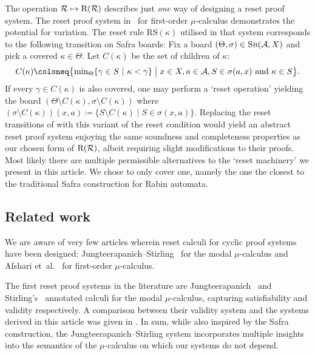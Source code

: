 The operation $\mathcal{R} \mapsto \mathrm{R}(\mathcal{R})$ describes just \emph{one} way of
designing a reset proof system.
The reset proof system in~\parencite{afshariCyclicProofsFirstorder2022a} for first-order \( \mu \)-calculus demonstrates the potential for variation.
The reset rule $\text{RS}(\kappa)$ utilised in that system corresponds
 to the following transition on Safra boards: Fix
a board $(\Theta, \sigma) \in \textsc{Sb}(\mathcal{A}, X)$ and pick a covered $\kappa \in
\Theta$. Let $C(\kappa)$ be the set of children of $\kappa$:
\[
  C(\kappa)
  \coloneq \bigl\{\text{min}_\Theta \{\gamma \in S ~|~ \kappa < \gamma\} \bigm| x \in X, a \in
  \Aa, S \in \sigma(a, x) \text{ and } \kappa \in S\bigr\}.
\]
If every $\gamma \in
C(\kappa)$ is also covered, one may perform a `reset operation' yielding the
board $(\Theta \setminus C(\kappa), \sigma \setminus C(\kappa))$ where $(\sigma
\setminus C(\kappa))(x, a) \coloneq \{S \setminus C(\kappa) \mid S \in \sigma(x,
a)\}$. Replacing the reset transitions of  with this variant of
the reset condition would yield an abstract reset proof system
enjoying the same soundness and completeness properties as our chosen form of $\mathrm{R}(\mathcal{R})$, albeit requiring
slight modifications to their proofs. Most likely there are multiple
permissible alternatives to the `reset machinery' we
present in this article. We chose to only
cover one, namely the one the closest to the traditional Safra construction for
Rabin automata.

\subsection*{Related work}
We are aware of very few articles wherein reset calculi for cyclic proof systems have been designed:
Jungteerapanich--Stirling~\parencite{jungteerapanichTableauSystemsModal2010,stirlingProofSystemNames2013} for the modal \( \mu \)-calculus
and Afshari et~al.~\parencite{afshariCyclicProofsFirstorder2022a} for first-order \( \mu \)-calculus.

The first reset proof systems in the literature are
Jungteerapanich~\parencite{jungteerapanichTableauSystemsModal2010} and
Stirling's~\parencite{stirlingProofSystemNames2013} annotated calculi for the
modal $\mu$-calculus, capturing satisfiability and validity respectively. A comparison
between their validity system and the systems derived in this article was given in . In sum,
while also inspired by the Safra construction, the Jungteerapanich--Stirling system incorporates
multiple insights into the semantics of the $\mu$-calculus on which our systems
do not depend.

